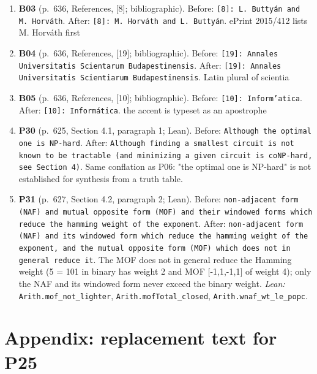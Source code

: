 \documentclass[9pt,twocolumn]{article}
\begin{document}
\begin{enumerate}[label=]
\item \textbf{B03} (p.~636, References, [8]; bibliographic). Before: \texttt{[8]: L. Buttyán and M. Horváth}. After: \texttt{[8]: M. Horváth and L. Buttyán}. ePrint 2015/412 lists M. Horváth first 
\item \textbf{B04} (p.~636, References, [19]; bibliographic). Before: \texttt{[19]: Annales Universitatis Scientarum Budapestinensis}. After: \texttt{[19]: Annales Universitatis Scientiarum Budapestinensis}. Latin plural of scientia 
\item \textbf{B05} (p.~636, References, [10]; bibliographic). Before: \texttt{[10]: Inform'atica}. After: \texttt{[10]: Informática}. the accent is typeset as an apostrophe 
\item \textbf{P30} (p.~625, Section 4.1, paragraph 1; Lean). Before: \texttt{Although the optimal one is NP-hard}. After: \texttt{Although finding a smallest circuit is not known to be tractable (and minimizing a given circuit is coNP-hard, see Section 4)}. Same conflation as P06: "the optimal one is NP-hard" is not established for synthesis from a truth table. 
\item \textbf{P31} (p.~627, Section 4.2, paragraph 2; Lean). Before: \texttt{non-adjacent form (NAF) and mutual opposite form (MOF) and their windowed forms which reduce the hamming weight of the exponent}. After: \texttt{non-adjacent form (NAF) and its windowed form which reduce the hamming weight of the exponent, and the mutual opposite form (MOF) which does not in general reduce it}. The MOF does not in general reduce the Hamming weight (5 = 101 in binary has weight 2 and MOF [-1,1,-1,1] of weight 4); only the NAF and its windowed form never exceed the binary weight. \emph{Lean:} \texttt{Arith.mof\_not\_lighter}, \texttt{Arith.mofTotal\_closed}, \texttt{Arith.wnaf\_wt\_le\_popc}. 
\end{enumerate}
\onecolumn\section*{Appendix: replacement text for P25}
\end{document}
